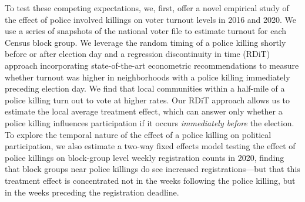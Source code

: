 \documentclass[12pt]{article}
\begin{document}
To test these competing expectations, %
we, first, offer a novel empirical study of the effect of police involved killings on voter turnout levels in 2016 and 2020. We use a series of snapshots of the national voter file to estimate turnout for each Census block group. We leverage the random timing of a police killing shortly before or after election day and a regression discontinuity in time (RDiT) approach incorporating state-of-the-art econometric recommendations \citep{Calonico2014, Stommes2021} to measure whether turnout was higher in neighborhoods with a police killing immediately preceding election day. We find that local communities within a half-mile of a police killing turn out to vote at higher rates. Our RDiT approach allows us to estimate the local average treatment effect, which can answer only whether a police killing influences participation if it occurs \textit{immediately before} the election. To explore the temporal nature of the effect of a police killing on political participation, we also estimate a two-way fixed effects model \citep{Callaway2021} testing the effect of police killings on block-group level weekly registration counts in 2020, finding that block groups near police killings do see increased registrations---but that this treatment effect is concentrated not in the weeks following the police killing, but in the weeks preceding the registration deadline.
\end{document}

